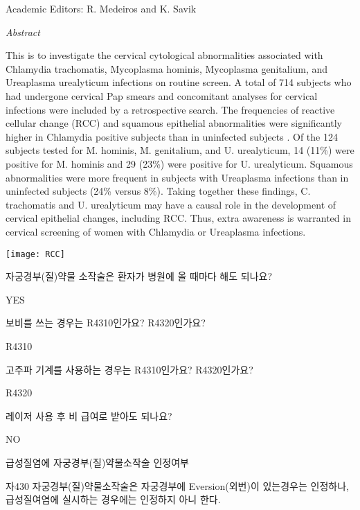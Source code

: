{Academic Editors: R. Medeiros and K. Savik\par


\emph{Abstract}\par

This is to investigate the cervical cytological abnormalities associated with Chlamydia trachomatis, Mycoplasma hominis, Mycoplasma genitalium, and Ureaplasma urealyticum infections on routine screen. A total of 714 subjects who had undergone cervical Pap smears and concomitant analyses for cervical infections were included by a retrospective search. The frequencies of reactive cellular change (RCC) and squamous epithelial abnormalities were significantly higher in Chlamydia positive subjects than in uninfected subjects . Of the 124 subjects tested for M. hominis, M. genitalium, and U. urealyticum, 14 (11\%) were positive for M. hominis and 29 (23\%) were positive for U. urealyticum. Squamous abnormalities were more frequent in subjects with Ureaplasma infections than in uninfected subjects (24\% versus 8\%). Taking together these findings, C. trachomatis and U. urealyticum may have a causal role in the development of cervical epithelial changes, including RCC. Thus, extra awareness is warranted in cervical screening of women with Chlamydia or Ureaplasma infections.
}

\texttt{[image: RCC]}

자궁경부(질)약물 소작술은 환자가 병원에 올 때마다 해도 되나요?
\begin{quotebox}
YES
\end{quotebox}

보비를 쓰는 경우는 R4310인가요? R4320인가요?
\begin{quotebox}
R4310
\end{quotebox} 
고주파 기계를 사용하는 경우는 R4310인가요? R4320인가요?
\begin{quotebox}
R4320
\end{quotebox}
레이저 사용 후 비 급여로 받아도 되나요?
\begin{quotebox}
NO
\end{quotebox}
급성질염에 자궁경부(질)약물소작술 인정여부
\begin{quotebox}
자430 자궁경부(질)약물소작술은 자궁경부에 Eversion(외번)이 있는경우는 인정하나, 급성질여염에 실시하는 경우에는 인정하지 아니 한다.
\end{quotebox}
